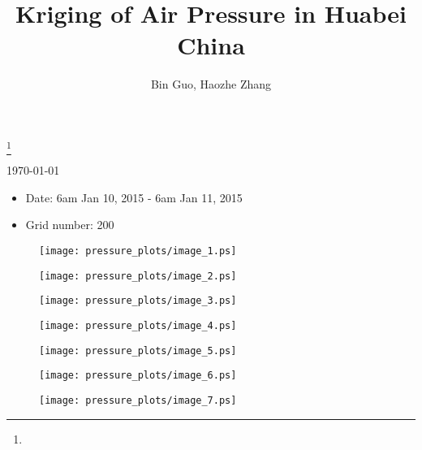 \documentclass[11pt]{amsart}
\theoremstyle{plain}%
\theoremstyle{definition}
\theoremstyle{remark}
\numberwithin{equation}{thm}
\begin{document}
\title{Kriging of Air Pressure in Huabei China}
\thanks{}
\author[Guo, Zhang]{Bin Guo, Haozhe Zhang}
\today

\maketitle
\begin{itemize}
\item Date: 6am Jan 10, 2015  - 6am Jan 11, 2015
\item Grid number: 200
\end{itemize}

\begin{figure}[H]
\begin{center}
\texttt{[image: pressure\_plots/image\_1.ps]} 
\end{center}
\end{figure}

\begin{figure}[H]
\begin{center}
\texttt{[image: pressure\_plots/image\_2.ps]} 
\end{center}
\end{figure}

\begin{figure}[H]
\begin{center}
\texttt{[image: pressure\_plots/image\_3.ps]} 
\end{center}
\end{figure}

\begin{figure}[H]
\begin{center}
\texttt{[image: pressure\_plots/image\_4.ps]} 
\end{center}
\end{figure}

\begin{figure}[H]
\begin{center}
\texttt{[image: pressure\_plots/image\_5.ps]} 
\end{center}
\end{figure}

\begin{figure}[H]
\begin{center}
\texttt{[image: pressure\_plots/image\_6.ps]} 
\end{center}
\end{figure}

\begin{figure}[H]
\begin{center}
\texttt{[image: pressure\_plots/image\_7.ps]} 
\end{center}
\end{figure}
\end{document}
